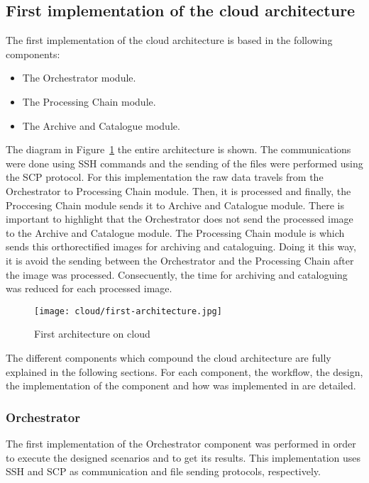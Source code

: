 \subsection{First implementation of the cloud architecture}

The first implementation of the cloud architecture is based in the following
components:
\begin{itemize}
\item The Orchestrator module.
\item The Processing Chain module.
\item The Archive and Catalogue module.
\end{itemize}

The diagram in Figure~\ref{fig:first-architecture} the entire architecture is shown. The
communications were done using \ac{SSH} commands and the sending of the files were
performed using the \ac{SCP} protocol. For this implementation the raw data
travels from the Orchestrator to Processing Chain module. Then, it is
processed and finally, the Proccesing Chain module sends it to Archive and
Catalogue module. There is important to highlight that the
Orchestrator does not send the processed image to the Archive and Catalogue
module. The Processing Chain module is which sends this orthorectified images
for archiving and cataloguing. Doing it this way, it is avoid the sending between the Orchestrator
and the Processing Chain after the image was processed. Consecuently, the time for
archiving and cataloguing was reduced for each processed image.

\begin{figure}[!h]
\begin{center}
\texttt{[image: cloud/first-architecture.jpg]}
\caption{First architecture on cloud}
\label{fig:first-architecture}
\end{center}
\end{figure}

The different components which compound the cloud architecture are fully
explained in the following sections. For each component, the  workflow, the
design, the implementation of the component and how was implemented in \bonfire are detailed.

\subsubsection{Orchestrator}

The first implementation of the Orchestrator component was performed in order to
execute the designed scenarios and to get its results. This implementation uses
\ac{SSH} and \ac{SCP} as communication and file sending protocols, respectively. 

